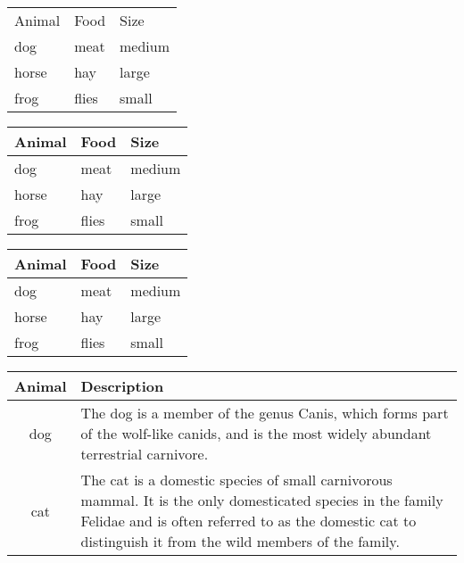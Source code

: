 \documentclass{article}
\begin{document}
\begin{tabular}{*{3}{l}}
  Animal & Food  & Size   \\
  dog    & meat  & medium \\
  horse  & hay   & large  \\
  frog   & flies & small  \\
\end{tabular}


\newpage 

\begin{tabular}{lll}
  \toprule
  Animal & Food  & Size   \\
  \midrule
  dog    & meat  & medium \\
  horse  & hay   & large  \\
  frog   & flies & small  \\
  \bottomrule
\end{tabular}

\newpage


\begin{tabular}{lll}
  \toprule
  Animal & Food  & Size   \\
  \midrule
  dog    & meat  & medium \\
  \cmidrule{1-2}
  horse  & hay   & large  \\
  \cmidrule{1-1}
  \cmidrule{3-3}
  frog   & flies & small  \\
  \bottomrule
\end{tabular}

\newpage



\begin{tabular}{cp{9cm}}
  \toprule
  Animal & Description \\
  \midrule
  dog    & The dog is a member of the genus Canis, which forms part of the
           wolf-like canids, and is the most widely abundant terrestrial
           carnivore. \\
  \addlinespace
  cat    & The cat is a domestic species of small carnivorous mammal. It is the
           only domesticated species in the family Felidae and is often referred
           to as the domestic cat to distinguish it from the wild members of the
           family. \\
  \bottomrule
\end{tabular}
\end{document}
